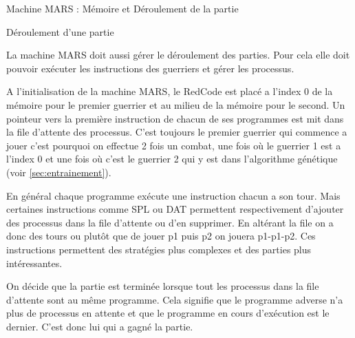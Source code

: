 \documentclass[a4paper, 10pt]{article}
\begin{document}
\begin{section}{Machine MARS : Mémoire et Déroulement de la partie}
        \begin{subsection}{Déroulement d'une partie}\label{sec:deroulement}
            \par
                La machine MARS doit aussi gérer le déroulement des parties. Pour cela elle doit pouvoir exécuter les instructions des guerriers et gérer les processus.
                \medskip
            \par
                A l'initialisation de la machine MARS, le RedCode est placé a l'index 0 de la mémoire pour le premier guerrier et au milieu de la mémoire pour le second. Un pointeur vers la première instruction de chacun de ses programmes est mit dans la file d'attente des processus. C'est toujours le premier guerrier qui commence a jouer c'est pourquoi on effectue 2 fois un combat, une fois où le guerrier 1 est a l'index 0 et une fois où c'est le guerrier 2 qui y est dans l'algorithme génétique (voir \ref{sec:entrainement}).
                \medskip
            \par
                En général chaque programme exécute une instruction chacun a son tour. Mais certaines instructions comme SPL ou DAT permettent respectivement d'ajouter des processus dans la file d'attente ou d'en supprimer. En altérant la file on a donc des tours ou plutôt que de jouer p1 puis p2 on jouera p1-p1-p2. Ces instructions permettent des stratégies plus complexes et des parties plus intéressantes.
                \medskip
            \par
                On décide que la partie est terminée lorsque tout les processus dans la file d'attente sont au même programme. Cela signifie que le programme adverse n'a plus de processus en attente et que le programme en cours d'exécution est le dernier. C'est donc lui qui a gagné la partie.
        \end{subsection}
        \bigskip
    \end{section}
\end{document}
